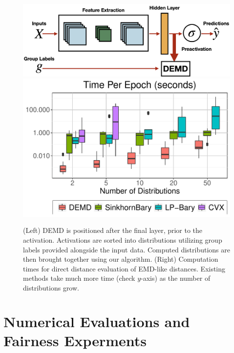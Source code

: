 \begin{figure}[t]
\vspace{-0.1in}
    \centering
    \raisebox{\baselineskip}%
    {\includegraphics[width=0.55\columnwidth]{6_demd/figs/net_diff_new.png}%
    }%
    \;
    \includegraphics[width=0.35\columnwidth]{6_demd/figs/Distance_Comparisons.pdf}
    \caption[DEMD regularization and computation speedups]{\label{fig:dists} (Left) DEMD is positioned after the final layer, prior to the activation. Activations are sorted into distributions utilizing group labels provided alongside the input data. Computed distributions are then brought together using our algorithm. (Right) Computation times for direct distance evaluation of EMD-like distances. Existing methods take much more time {\color{blue}(check $y$-axis)} as the number of distributions grow.}
    \vspace{-5pt}
\end{figure}

\section{Numerical Evaluations and Fairness Experments}
\label{sec:results}
\vspace{-5pt}


